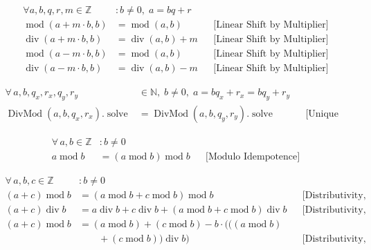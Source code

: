 \begin{equation*}
\begin{aligned}
\forall a,b,q,r,m \in \mathbb{Z} &: b \neq 0,\; a = bq + r \\
\operatorname{mod}(a + m \cdot b, b) &= \operatorname{mod}(a, b) &&\text{[Linear Shift by Multiplier]} \\
\operatorname{div}(a + m \cdot b, b) &= \operatorname{div}(a, b) + m &&\text{[Linear Shift by Multiplier]} \\
\operatorname{mod}(a - m \cdot b, b) &= \operatorname{mod}(a, b) &&\text{[Linear Shift by Multiplier]} \\
\operatorname{div}(a - m \cdot b, b) &= \operatorname{div}(a, b) - m &&\text{[Linear Shift by Multiplier]}
\end{aligned}
\end{equation*}

\begin{equation*}
\begin{aligned}
\forall\, a,b,q_x,r_x,q_y,r_y &\in \mathbb{N},\; b \neq 0,\;
  a = bq_x + r_x = bq_y + r_y \\
\operatorname{DivMod}(a,b,q_x,r_x).\operatorname{solve}
  &= \operatorname{DivMod}(a,b,q_y,r_y).\operatorname{solve}
  &&\text{[Unique Remainder]}
\end{aligned}
\end{equation*}

\begin{equation*}
\begin{aligned}
\forall\, a, b \in \mathbb{Z} &: b \neq 0 \\
a \operatorname{mod} b
  &= ( a \operatorname{mod} b ) \operatorname{mod} b
  &&\text{[Modulo Idempotence]}
\end{aligned}
\end{equation*}

\begin{equation*}
\begin{aligned}
\forall\, a, b, c \in \mathbb{Z} &: b \neq 0 \\
( a + c ) \operatorname{mod} b
  &= ( a \operatorname{mod} b + c \operatorname{mod} b )
     \operatorname{mod} b &&\text{[Distributivity, Addition]} \\
( a + c ) \operatorname{div} b
  &= a \operatorname{div} b + c \operatorname{div} b
     + ( a \operatorname{mod} b + c \operatorname{mod} b )
       \operatorname{div} b &&\text{[Distributivity, Addition]} \\
( a + c) \operatorname{mod} b
  &= (a \operatorname{mod} b) + (c \operatorname{mod} b)
     - b \cdot (((a \operatorname{mod} b) \\
  &\qquad + (c \operatorname{mod} b)) \operatorname{div} b)
  &&\text{[Distributivity, Addition]}
\end{aligned}
\end{equation*}

